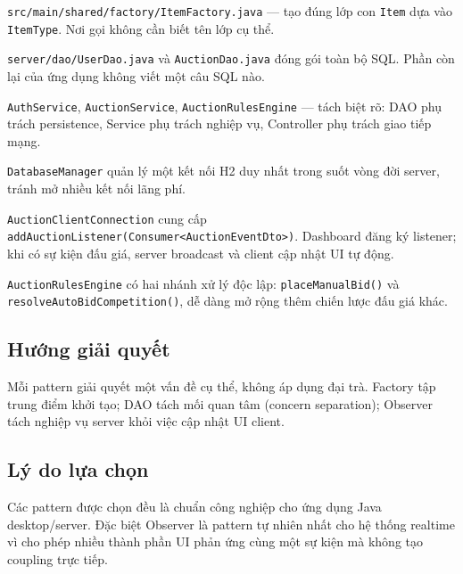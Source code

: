 \documentclass[12pt,a4paper]{article}
\newcommand{\filepath}[1]{\texttt{\small #1}}
\begin{document}
\begin{description}[leftmargin=2em, style=nextline]
  \item[\textbf{Factory Pattern}]
    \filepath{src/main/shared/factory/ItemFactory.java} — tạo đúng lớp con \texttt{Item} dựa vào \texttt{ItemType}. Nơi gọi không cần biết tên lớp cụ thể.

  \item[\textbf{DAO (Data Access Object)}]
    \filepath{server/dao/UserDao.java} và \filepath{AuctionDao.java} đóng gói toàn bộ SQL. Phần còn lại của ứng dụng không viết một câu SQL nào.

  \item[\textbf{Service Layer}]
    \filepath{AuthService}, \filepath{AuctionService}, \filepath{AuctionRulesEngine} — tách biệt rõ: DAO phụ trách persistence, Service phụ trách nghiệp vụ, Controller phụ trách giao tiếp mạng.

  \item[\textbf{Singleton}]
    \filepath{DatabaseManager} quản lý một kết nối H2 duy nhất trong suốt vòng đời server, tránh mở nhiều kết nối lãng phí.

  \item[\textbf{Observer / Listener}]
    \filepath{AuctionClientConnection} cung cấp \texttt{addAuctionListener(Consumer<AuctionEventDto>)}. Dashboard đăng ký listener; khi có sự kiện đấu giá, server broadcast và client cập nhật UI tự động.

  \item[\textbf{Strategy (implicit)}]
    \filepath{AuctionRulesEngine} có hai nhánh xử lý độc lập: \texttt{placeManualBid()} và \texttt{resolveAutoBidCompetition()}, dễ dàng mở rộng thêm chiến lược đấu giá khác.
\end{description}

\subsection*{Hướng giải quyết}
Mỗi pattern giải quyết một vấn đề cụ thể, không áp dụng đại trà. Factory tập trung điểm khởi tạo; DAO tách mối quan tâm (concern separation); Observer tách nghiệp vụ server khỏi việc cập nhật UI client.

\subsection*{Lý do lựa chọn}
Các pattern được chọn đều là chuẩn công nghiệp cho ứng dụng Java desktop/server. Đặc biệt Observer là pattern tự nhiên nhất cho hệ thống realtime vì cho phép nhiều thành phần UI phản ứng cùng một sự kiện mà không tạo coupling trực tiếp.
\end{document}
